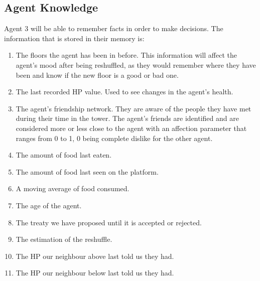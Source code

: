 \subsection{Agent Knowledge}
Agent 3 will be able to remember facts in order to make decisions. The information that is stored in their memory is:
\begin{enumerate}
    \item The floors the agent has been in before. This information will affect the agent’s mood after being reshuffled, as they would remember where they have been and know if the new floor is a good or bad one.  
    \item The last recorded HP value. Used to see changes in the agent's health.
    \item The agent’s friendship network. They are aware of the people they have met during their time in the tower. The agent’s friends are identified and are considered more or less close to the agent with an affection parameter that ranges from 0 to 1, 0  being complete dislike for the other agent.
    \item The amount of food last eaten.
    \item The amount of food last seen on the platform.
    \item A moving average of food consumed.
    \item The age of the agent.
    \item The treaty we have proposed until it is accepted or rejected.
    \item The estimation of the reshuffle.
    \item The HP our neighbour above last told us they had.
    \item The HP our neighbour below last told us they had.
\end{enumerate}

